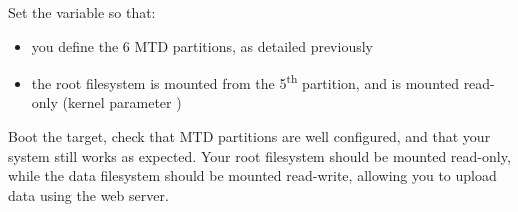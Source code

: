Set the  variable so that:

\begin{itemize}
\item you define the 6 MTD partitions, as detailed previously
\item the root filesystem is mounted from the 5\textsuperscript{th}
  partition, and is mounted read-only (kernel parameter )
\end{itemize}

Boot the target, check that MTD partitions are well configured, and
that your system still works as expected. Your root filesystem should
be mounted read-only, while the data filesystem should be mounted
read-write, allowing you to upload data using the web server.
